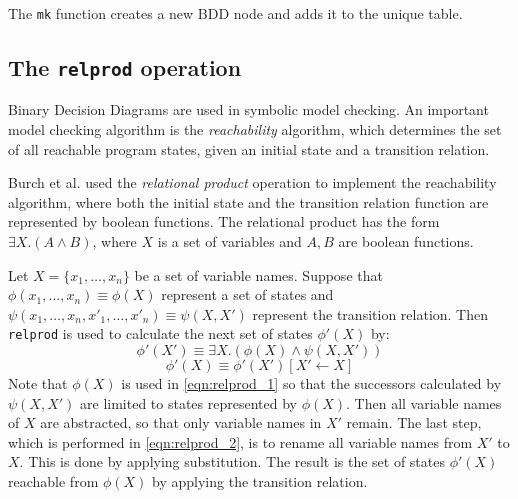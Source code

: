 The \texttt{mk} function creates a new BDD node and adds it to the unique table.

\subsection{The \texttt{relprod} operation}
Binary Decision Diagrams are used in symbolic model checking. An important model checking algorithm is the \emph{reachability} algorithm, which determines the set of all reachable program states, given an initial state and a transition relation. 

Burch et al. \cite{burch1994symbolic} used the \emph{relational product} operation to implement the reachability algorithm, where both the initial state and the transition relation function are represented by boolean functions. The relational product has the form $\exists X. (A \wedge B)$, where $X$ is a set of variables and $A, B$ are boolean functions.

Let $X = \{ x_1, \dots, x_n \}$ be a set of variable names. Suppose that $\phi(x_1, \dots, x_n) \equiv \phi(X)$ represent a set of states and $\psi(x_1, \dots, x_n, x'_1, \dots, x'_n) \equiv \psi(X, X')$ represent the transition relation. Then \texttt{relprod} is used to calculate the next set of states $\phi'(X)$ by:
\begin{equation}
	\phi'(X') \equiv \exists X. (\phi(X) \wedge \psi(X, X'))
	\label{eqn:relprod_1}
\end{equation}
\begin{equation}
	\phi'(X) \equiv \phi'(X')[X' \gets X]
	\label{eqn:relprod_2}
\end{equation}
Note that $\phi(X)$ is used in \ref{eqn:relprod_1} so that the successors calculated by $\psi(X, X')$ are limited to states represented by $\phi(X)$. Then all variable names of $X$ are abstracted, so that only variable names in $X'$ remain. The last step, which is performed in \ref{eqn:relprod_2}, is to rename all variable names from $X'$ to $X$. This is done by applying substitution. The result is the set of states $\phi'(X)$ reachable from $\phi(X)$ by applying the transition relation.


